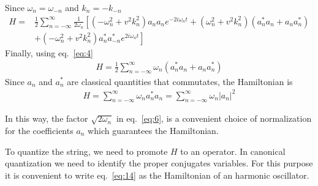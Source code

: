 \begin{frame}
Since $\omega_n=\omega_{-n}$ and $k_n=-k_{-n}$
\begin{align}
 H =  &\frac12
\sum_{n=-\infty}^\infty \frac{1}{2\omega_n}
  \left[(- \omega_n^2+v^2 k_n^2)a_n a_n e^{-2i\omega_n t}
+( \omega_n^2+v^2 k_n^2)(a_n^*a_n+a_n a_n^*)\right.\nonumber\\
&+\left.(- \omega_n^2+v^2 k_n^2)a_n^*a_{-n}^*e^{2i\omega_n t}\right]
\end{align}
Finally, using eq.~\eqref{eq:4}
\begin{align}
\label{eq:13}
  H=\frac{1}{2}\sum_{n=-\infty}^\infty\omega_n(a_n^*a_n+a_n a_n^*)
\end{align}
Since $a_n$ and $a_n^*$ are classical quantities that commutates, the Hamiltonian is
\begin{align}
  \label{eq:14}
  H=\sum_{n=-\infty}^\infty\omega_na_n^*a_n=\sum_{n=-\infty}^\infty\omega_n|a_n|^2
\end{align}

In this way, the factor $\sqrt{2\omega_{n}}$ in eq.~\eqref{eq:6}, is a convenient choice of normalization for the coefficients $a_n$ which guarantees the Hamiltonian.

To quantize the string, we need to promote $H$ to an operator. In canonical quantization we need to identify the proper conjugates variables. For this purpose it is convenient to write eq.~\eqref{eq:14} as the Hamiltonian of an harmonic oscillator.
\end{frame}
